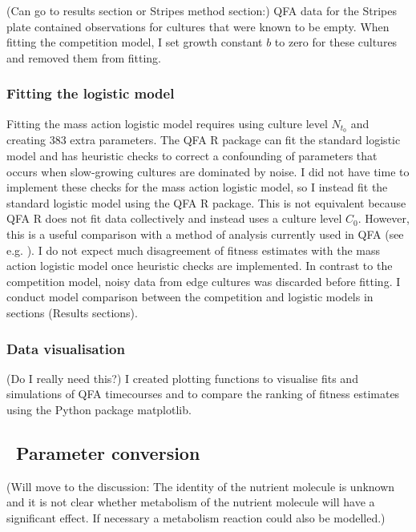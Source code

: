 (Can go to results section or Stripes method section:) QFA data for
the Stripes plate contained observations for cultures that were known
to be empty. When fitting the competition model, I set growth constant
\(b\) to zero for these cultures and removed them from fitting.

\subsubsection{Fitting the logistic model}

Fitting the mass action logistic model requires using culture level
\(N_{t_{0}}\) and creating 383 extra parameters. The QFA R package
\citep{qfa2016} can fit the standard logistic model and has heuristic
checks to correct a confounding of parameters that occurs when
slow-growing cultures are dominated by noise. I did not have time to
implement these checks for the mass action logistic model, so I
instead fit the standard logistic model using the QFA R package. This
is not equivalent because QFA R does not fit data collectively and
instead uses a culture level \(C_{0}\). However, this is a useful
comparison with a method of analysis currently used in QFA (see
e.g. \citet{Addinall2011}). I do not expect much disagreement of
fitness estimates with the mass action logistic model once heuristic
checks are implemented. In contrast to the competition model, noisy
data from edge cultures was discarded before fitting. I conduct model
comparison between the competition and logistic models in sections
(Results sections).

\subsubsection{Data visualisation}

(Do I really need this?) I created plotting functions to visualise
fits and simulations of QFA timecourses and to compare the ranking of
fitness estimates using the Python package matplotlib.

\subsection{\thesubsection~Parameter conversion}

(Will move to the discussion: The identity of the nutrient molecule is
unknown and it is not clear whether metabolism of the nutrient
molecule will have a significant effect. If necessary a
metabolism reaction could also be modelled.)\\

